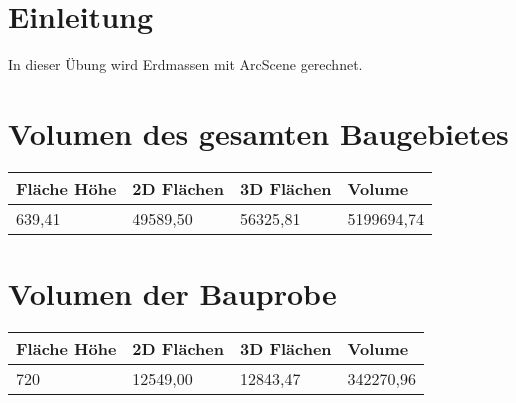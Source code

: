 \documentclass[12pt]{article}
\begin{document}
	\pagestyle{main}
\tableofcontents
\newpage
\section{Einleitung}
In dieser Übung wird Erdmassen mit ArcScene gerechnet.
\section{Volumen des gesamten Baugebietes}
\begin{table}[ht] \centering
	\begin{tabular}{|l|l|l|l|}
		\hline
		Fläche Höhe & 2D Flächen & 3D Flächen & Volume     \\ \hline
		639,41      & 49589,50   & 56325,81   & 5199694,74 \\ \hline
	\end{tabular}
\end{table}
\section{Volumen der Bauprobe}
\begin{table}[ht] \centering
	\begin{tabular}{|l|l|l|l|}
		\hline
		Fläche Höhe & 2D Flächen & 3D Flächen & Volume    \\ \hline
		720         & 12549,00   & 12843,47   & 342270,96 \\ \hline
	\end{tabular}
\end{table}
\end{document}
